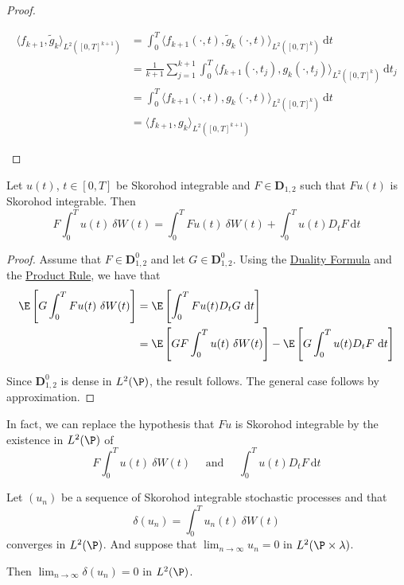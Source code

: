 \begin{proof}
\begin{enumerate}
\begin{equation*}
		\begin{aligned}
			\langle f_{k+1}, \widetilde{g}_k\rangle_{L^2\left([0, T]^{k+1}\right)} & =\int_0^T\langle f_{k+1}(\cdot, t), \widetilde{g}_k(\cdot, t)\rangle_{L^2\left([0, T]^k\right)} ~\mathrm{d} t \\
			& =\frac{1}{k+1} \sum_{j=1}^{k+1} \int_0^T\langle f_{k+1}(\cdot, t_j), g_k(\cdot, t_j)\rangle_{L^2\left([0, T]^k\right)} ~\mathrm{d} t_j \\
			& =\int_0^T\langle f_{k+1}(\cdot, t), g_k(\cdot, t)\rangle_{L^2\left([0, T]^k\right)} ~\mathrm{d} t \\
			& =\langle f_{k+1}, g_k\rangle_{L^2\left([0, T]^{k+1}\right)}
		\end{aligned}
		\end{equation*}
	\end{enumerate}
\end{proof}

\begin{theorem}
	Let $u(t)$, $t \in [0,T]$ be Skorohod integrable and $F \in \mathbf{D}_{1,2}$ such that $Fu(t)$ is Skorohod integrable. Then 
	$$
	F \int_0^T u(t) ~\delta W(t) = \int_0^T Fu(t) ~\delta W(t) + \int_0^T u(t) D_t F~\mathrm{d}t
	$$
\end{theorem}

\begin{proof}
	Assume that $F \in \mathbf{D}_{1,2}^0$ and let $G \in \mathbf{D}_{1,2}^0$. Using the \hyperref[thm:duality_formula]{Duality Formula} and the \hyperref[thm:product_rule]{Product Rule}, we have that 
	\begin{equation*}
		\begin{aligned}
			\E \left[ G \int_0^T Fu(t)~\delta W(t) \right] &= \E \left[ \int_0^T Fu(t) D_t G~\mathrm{d}t \right] \\
									       &= \E \left[ GF \int_0^T u(t)~\delta W(t) \right] - \E \left[ G \int_0^T u(t) D_t F~\mathrm{d}t \right]
		\end{aligned}
	\end{equation*}

	Since $\mathbf{D}_{1,2}^0$ is dense in $L^2(\P)$, the result follows. The general case follows by approximation.
\end{proof}

In fact, we can replace the hypothesis that $Fu$ is Skorohod integrable by the existence in $L^2(\P)$ of 
$$
F \int_0^T u(t) ~\delta W(t) \quad \text{ and } \quad \int_0^T u(t) D_t F ~\mathrm{d}t
$$

\begin{theorem}
Let $(u_n)$ be a sequence of Skorohod integrable stochastic processes and that 
$$
\delta(u_n) = \int_0^T u_n(t) ~\delta W(t)
$$
converges in $L^2(\P)$. And suppose that $\lim_{n \to \infty} u_n = 0$ in $L^2(\P \times \lambda)$. 

Then 
$ 
\lim_{n \to \infty} \delta(u_n) = 0
$
in $L^2(\P)$. 
\end{theorem}

